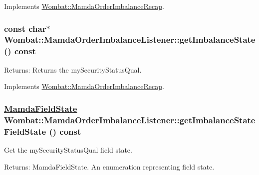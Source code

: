 Implements \hyperlink{classWombat_1_1MamdaOrderImbalanceRecap_f634674460d3c12123544852fcda939c}{Wombat::Mamda\-Order\-Imbalance\-Recap}.\hypertarget{classWombat_1_1MamdaOrderImbalanceListener_0c165617508c80658877e499eb3c2e41}{
\subsubsection[getImbalanceState]{\setlength{\rightskip}{0pt plus 5cm}const char$\ast$ Wombat::Mamda\-Order\-Imbalance\-Listener::get\-Imbalance\-State () const}}
\label{classWombat_1_1MamdaOrderImbalanceListener_0c165617508c80658877e499eb3c2e41}


\begin{Desc}
\item[Returns:]Returns the my\-Security\-Status\-Qual. \end{Desc}


Implements \hyperlink{classWombat_1_1MamdaOrderImbalanceRecap_380353bc10d950df839870cb6423def3}{Wombat::Mamda\-Order\-Imbalance\-Recap}.\hypertarget{classWombat_1_1MamdaOrderImbalanceListener_63cc4f92d2bbd8f122922d5f4fb2932b}{
\subsubsection[getImbalanceStateFieldState]{\setlength{\rightskip}{0pt plus 5cm}\hyperlink{namespaceWombat_93aac974f2ab713554fd12a1fa3b7d2a}{Mamda\-Field\-State} Wombat::Mamda\-Order\-Imbalance\-Listener::get\-Imbalance\-State\-Field\-State () const}}
\label{classWombat_1_1MamdaOrderImbalanceListener_63cc4f92d2bbd8f122922d5f4fb2932b}


Get the my\-Security\-Status\-Qual field state. 

\begin{Desc}
\item[Returns:]Mamda\-Field\-State. An enumeration representing field state. \end{Desc}


